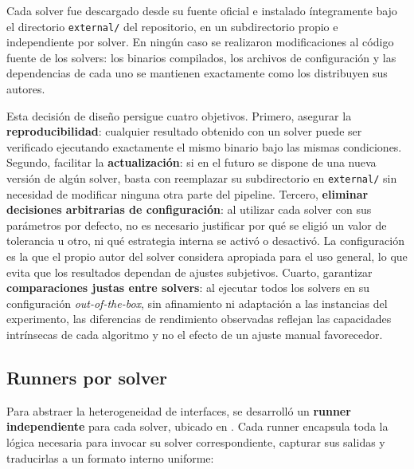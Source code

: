 Cada solver fue descargado desde su fuente oficial e instalado íntegramente bajo el
directorio \texttt{external/} del repositorio, en un subdirectorio propio e
independiente por solver.
En ningún caso se realizaron modificaciones al código fuente de los solvers: los
binarios compilados, los archivos de configuración y las dependencias de cada uno se
mantienen exactamente como los distribuyen sus autores.

Esta decisión de diseño persigue cuatro objetivos.
Primero, asegurar la \textbf{reproducibilidad}: cualquier resultado obtenido con un
solver puede ser verificado ejecutando exactamente el mismo binario bajo las mismas
condiciones.
Segundo, facilitar la \textbf{actualización}: si en el futuro se dispone de una nueva
versión de algún solver, basta con reemplazar su subdirectorio en \texttt{external/}
sin necesidad de modificar ninguna otra parte del pipeline.
Tercero, \textbf{eliminar decisiones arbitrarias de configuración}: al utilizar cada
solver con sus parámetros por defecto, no es necesario justificar por qué se eligió
un valor de tolerancia u otro, ni qué estrategia interna se activó o desactivó.
La configuración es la que el propio autor del solver considera apropiada para el
uso general, lo que evita que los resultados dependan de ajustes subjetivos.
Cuarto, garantizar \textbf{comparaciones justas entre solvers}: al ejecutar todos los
solvers en su configuración \emph{out-of-the-box}, sin afinamiento ni adaptación a
las instancias del experimento, las diferencias de rendimiento observadas reflejan
las capacidades intrínsecas de cada algoritmo y no el efecto de un ajuste manual
favorecedor.

\subsection{Runners por solver}
\label{subsec:avance_solvers_runners}

Para abstraer la heterogeneidad de interfaces, se desarrolló un \textbf{runner
independiente} para cada solver, ubicado en .
Cada runner encapsula toda la lógica necesaria para invocar su solver correspondiente,
capturar sus salidas y traducirlas a un formato interno uniforme:

